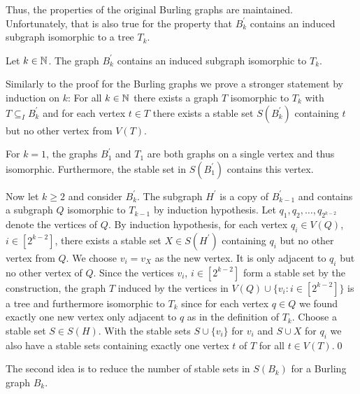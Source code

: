Thus, the properties of the original Burling graphs are maintained. Unfortunately, that is also true for the property that $B_k^\prime$ contains an induced subgraph isomorphic to a tree $T_k$.

\begin{thm}
Let $k\in\mathbb{N}$. The graph $B_k^\prime$ contains an induced subgraph isomorphic to $T_k$.
\end{thm}
\begin{prf}
Similarly to the proof for the Burling graphs we prove a stronger statement by induction on $k$: For all $k\in\mathbb{N}$ there exists a graph $T$ isomorphic to $T_k$ with $T\subseteq_I B_k^\prime$ and for each vertex $t\in T$ there exists a stable set $S(B_k^\prime )$ containing $t$ but no other vertex from $V(T)$.

For $k=1$, the graphs $B_1^\prime$ and $T_1$ are both graphs on a single vertex and thus isomorphic. Furthermore, the stable set in $S(B_1^\prime)$ contains this vertex.

Now let $k\geq 2$ and consider $B_k^\prime$. The subgraph $H^\prime$ is a copy of $B_{k-1}^\prime$ and contains a subgraph $Q$ isomorphic to $T_{k-1}$ by induction hypothesis.  Let $q_1, q_2,\dots , q_{2^{k-2}}$ denote the vertices of $Q$. By induction hypothesis, for each vertex $q_i\in V(Q)$, $i\in [2^{k-2}]$, there exists a stable set $X\in S(H^\prime)$ containing $q_i$ but no other vertex from $Q$. We choose $v_i=v_X$ as the new vertex. It is only adjacent to $q_i$ but no other vertex of $Q$. Since the vertices $v_i$, $i\in [2^{k-2}]$ form a stable set by the construction, the graph $T$ induced by the vertices in $V(Q)\cup \{v_i:i\in [2^{k-2}]\}$ is a tree and furthermore isomorphic to $T_k$ since for each vertex $q\in Q$ we found exactly one new vertex only adjacent to $q$ as in the definition of $T_k$. Choose a stable set $S\in S(H)$. With the stable sets $S\cup \{v_i\}$ for $v_i$ and $S\cup X$ for $q_i$ we also have a stable sets containing exactly one vertex $t$ of $T$ for all $t\in V(T)$.\qed
\end{prf}

The second idea is to reduce the number of stable sets in $S(B_k)$ for a Burling graph $B_k$. 